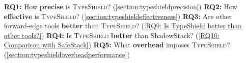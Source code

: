 %  
%   
% 
%  
%   

\textbf{RQ1:} How \textbf{precise} is \textsc{TypeShield}? (\cref{section:typeshieldprecision})
\textbf{RQ2:} How \textbf{effective} is \textsc{TypeShield}? (\cref{section:typeshieldeffectiveness})
\textbf{RQ3:} Are other forward-edge tools \textbf{better} than \textsc{TypeShield}? (\cref{RQ9: Is TypeShield better than other tools?})
\textbf{RQ4:} Is \textsc{TypeShield} \textbf{better} than ShadowStack? (\cref{RQ10: Comparison with SafeStack})
\textbf{RQ5:} What \textbf{overhead} imposes \textsc{TypeShield}? (\cref{section:typeshieldoverheadperformance})

